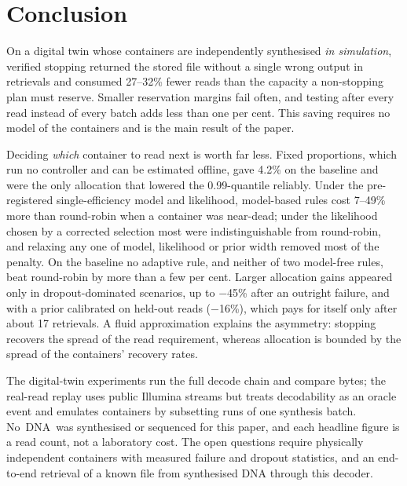 \documentclass[acmsmall,screen]{acmart}
\begin{document}
\section{Conclusion}
On a digital twin whose containers are independently synthesised \emph{in simulation}, verified stopping
returned the stored file without a single wrong output in \SafeN{} retrievals and consumed 27--32\% fewer
reads than the capacity a non-stopping plan must reserve.  Smaller reservation margins fail often, and
testing after every read instead of every batch adds less than one per cent.  This saving requires no
model of the containers and is the main result of the paper.

Deciding \emph{which} container to read next is worth far less.  Fixed proportions, which run no
controller and can be estimated offline, gave 4.2\% on the baseline and were the only allocation that
lowered the 0.99-quantile reliably.  Under the pre-registered single-efficiency model and likelihood,
model-based rules cost 7--49\% more than round-robin when a container was near-dead; under the likelihood
chosen by a corrected selection most were indistinguishable from round-robin, and relaxing any one of
model, likelihood or prior width removed most of the penalty.  On the baseline no adaptive rule, and
neither of two model-free rules, beat round-robin by more than a few per cent.  Larger allocation gains
appeared only in dropout-dominated scenarios, up to $-$45\% after an outright failure, and with a prior
calibrated on held-out reads ($-$16\%), which pays for itself only after about 17 retrievals.  A fluid
approximation explains the asymmetry: stopping recovers the spread of the read requirement, whereas
allocation is bounded by the spread of the containers' recovery rates.

The digital-twin experiments run the full decode chain and compare bytes; the real-read replay uses
public Illumina streams but treats decodability as an oracle event and emulates containers by subsetting
runs of one synthesis batch.  No~DNA~was synthesised or sequenced for this paper, and each headline figure
is a read count, not a laboratory cost.  The open questions require physically independent containers with
measured failure and dropout statistics, and an end-to-end retrieval of a known file from synthesised DNA
through this decoder.

\appendix
\end{document}
